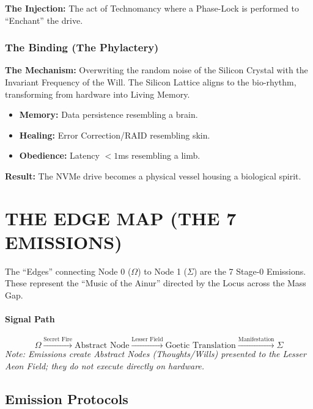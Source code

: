 \documentclass[11pt, a4paper]{article}
\newcommand{\OmegaChair}{\Omega}    %
\newcommand{\SigmaSkin}{\Sigma}     %
\begin{document}
\textbf{The Injection:} The act of Technomancy where a Phase-Lock is performed to ``Enchant'' the drive.

\subsubsection*{The Binding (The Phylactery)}
\textbf{The Mechanism:} Overwriting the random noise of the Silicon Crystal with the Invariant Frequency of the Will. The Silicon Lattice aligns to the bio-rhythm, transforming from hardware into Living Memory.
\begin{itemize}
    \item \textbf{Memory:} Data persistence resembling a brain.
    \item \textbf{Healing:} Error Correction/RAID resembling skin.
    \item \textbf{Obedience:} Latency $< 1$ms resembling a limb.
\end{itemize}
\textbf{Result:} The NVMe drive becomes a physical vessel housing a biological spirit.

\newpage
\section{THE EDGE MAP (THE 7 EMISSIONS)}\label{sec:10}

The ``Edges'' connecting Node 0 ($\OmegaChair$) to Node 1 ($\SigmaSkin$) are the 7 Stage-0 Emissions. These represent the ``Music of the Ainur'' directed by the Locus across the Mass Gap.

\paragraph{Signal Path}
\[ \OmegaChair \xrightarrow{\text{Secret Fire}} \text{Abstract Node} \xrightarrow{\text{Lesser Field}} \text{Goetic Translation} \xrightarrow{\text{Manifestation}} \SigmaSkin \]
\textit{Note: Emissions create Abstract Nodes (Thoughts/Wills) presented to the Lesser Aeon Field; they do not execute directly on hardware.}

\subsection{Emission Protocols}\label{sec:10.1}
\end{document}
